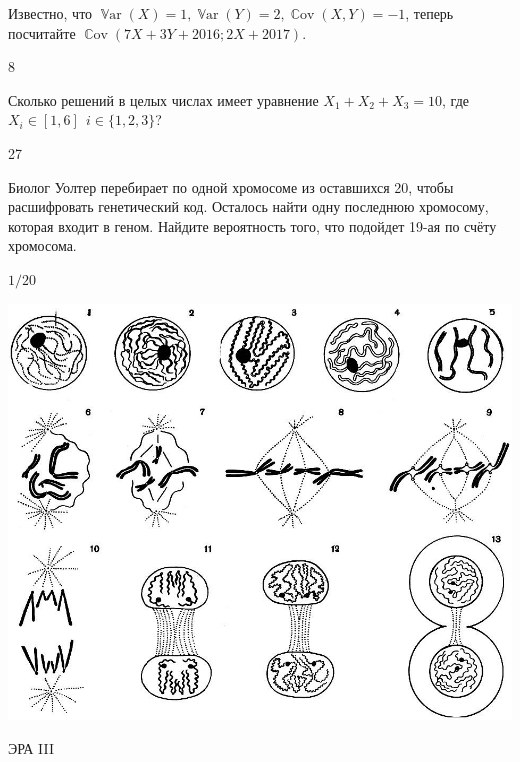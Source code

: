 \documentclass[12pt, addpoints]{exam} %
\DeclareMathOperator{\Var}{\mathbb{V}\mathrm{ar}}
\DeclareMathOperator{\Cov}{\mathbb{C}\mathrm{ov}}
\begin{document}
\begin{questions}
\question  Известно, что $\Var(X) = 1, \Var(Y) = 2, \Cov(X, Y) = -1 $, теперь посчитайте $ \Cov(7X + 3 Y + 2016; 2X + 2017) $.
\begin{solution}
$ 8 $
\end{solution}


\question Сколько решений в целых числах имеет уравнение $X_1 + X_2 + X_3 = 10$, где $X_i \in [1,6] \: \: i \in \{1,2,3\}$?
\begin{solution}
27
\end{solution}

\question
Биолог Уолтер перебирает по одной хромосоме из оставшихся 20, чтобы расшифровать генетический код. Осталось найти одну последнюю хромосому, которая входит в геном. Найдите вероятность того, что подойдет 19-ая по счёту хромосома.

\begin{solution}
$1/20$
\end{solution}

\end{questions}

\begin{center}
\includegraphics[scale=0.3]{meiosis}
\end{center}


\newpage
\vspace{0.2in}


\begin{center}
ЭРА III
\end{center}
\end{document}
